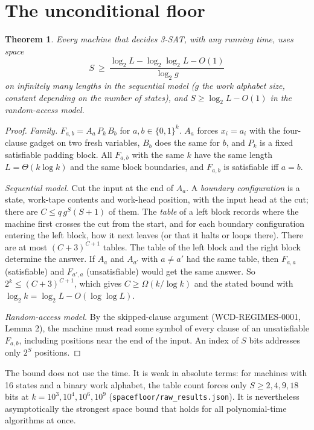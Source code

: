 \documentclass[11pt]{article}
\newtheorem{theorem}{Theorem}
\begin{document}
\section{The unconditional floor}
\begin{theorem}\label{thm:log}
Every machine that decides 3-SAT, with any running time, uses space
\[S\ \ge\ \frac{\log_2L-\log_2\log_2L-O(1)}{\log_2 g}\]
on infinitely many lengths in the sequential model ($g$ the work alphabet size, constant depending on the number of states), and $S\ge\log_2L-O(1)$ in the random-access model.
\end{theorem}
\begin{proof}
\emph{Family.} $F_{a,b}=A_a\,P_k\,B_b$ for $a,b\in\{0,1\}^{k}$. $A_a$ forces $x_i=a_i$ with the four-clause gadget on two fresh variables, $B_b$ does the same for $b$, and $P_k$ is a fixed satisfiable padding block. All $F_{a,b}$ with the same $k$ have the same length $L=\Theta(k\log k)$ and the same block boundaries, and $F_{a,b}$ is satisfiable iff $a=b$.

\emph{Sequential model.} Cut the input at the end of $A_a$. A \emph{boundary configuration} is a state, work-tape contents and work-head position, with the input head at the cut; there are $C\le q\,g^{S}(S+1)$ of them. The \emph{table} of a left block records where the machine first crosses the cut from the start, and for each boundary configuration entering the left block, how it next leaves (or that it halts or loops there). There are at most $(C+3)^{C+1}$ tables. The table of the left block and the right block determine the answer. If $A_a$ and $A_{a'}$ with $a\ne a'$ had the same table, then $F_{a,a}$ (satisfiable) and $F_{a',a}$ (unsatisfiable) would get the same answer. So $2^{k}\le(C+3)^{C+1}$, which gives $C\ge\Omega(k/\log k)$ and the stated bound with $\log_2k=\log_2L-O(\log\log L)$.

\emph{Random-access model.} By the skipped-clause argument (WCD-REGIMES-0001, Lemma 2), the machine must read some symbol of every clause of an unsatisfiable $F_{a,b}$, including positions near the end of the input. An index of $S$ bits addresses only $2^{S}$ positions.
\end{proof}
The bound does not use the time. It is weak in absolute terms: for machines with 16 states and a binary work alphabet, the table count forces only $S\ge2,4,9,18$ bits at $k=10^{3},10^{4},10^{6},10^{9}$ (\texttt{spacefloor/raw\_results.json}). It is nevertheless asymptotically the strongest space bound that holds for all polynomial-time algorithms at once.
\end{document}
